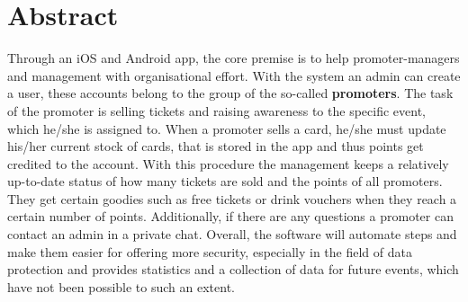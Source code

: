 \chapter{Abstract}
Through an iOS and Android app, the core premise is to help promoter-managers and management with organisational effort. 
With the system an admin can create a user, these accounts belong to the group of the so-called \textbf{promoters}.
The task of the promoter is selling tickets and raising awareness to the specific event, which he/she is assigned to. 
When a promoter sells a card, he/she must update his/her current stock of cards, that is stored in the app and thus points get credited to the account.
With this procedure the management keeps a relatively up-to-date status of how many tickets are sold and the points of all promoters.
They get certain goodies such as free tickets or drink vouchers when they reach a certain number of points.
Additionally, if there are any questions a promoter can contact an admin in a private chat.
Overall, the software will automate steps and make them easier for offering more security,
especially in the field of data protection and provides statistics and a collection of data for future events, which have not been possible to such an extent.